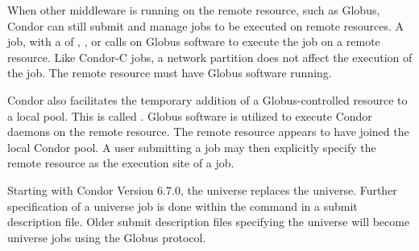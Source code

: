 When other middleware is running on the remote resource,
such as Globus,
Condor can still submit and manage jobs to be executed on
remote resources.
A   job,
with a  of
, , or 
calls on Globus software to execute the job on a remote resource.
Like Condor-C jobs, a network partition does not affect
the execution of the job.
The remote resource must have Globus software running.

Condor also facilitates the temporary addition of a
Globus-controlled resource to a local pool.
This is called .
Globus software is utilized to execute Condor daemons on the
remote resource.
The remote resource appears to have joined the local Condor pool.
A user submitting a job may then explicitly specify the
remote resource as the execution site of a job.

Starting with Condor Version 6.7.0, the  universe
replaces the  universe.
Further specification of a  universe job is done
within the  command in a submit description file.
Older submit description files specifying the 
universe will become  universe jobs using the
Globus  protocol.
